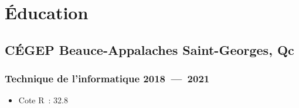 \documentclass[10pt]{article} %
\begin{document}
\section{Éducation}
\subsection{CÉGEP Beauce-Appalaches \hfill Saint-Georges, Qc}
\subsubsection{Technique de l'informatique \hfill 2018~---~2021}
\begin{itemize}
	\item Cote R~: 32.8
\end{itemize}
\end{document}

